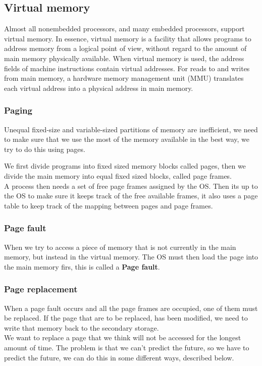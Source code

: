 \documentclass[titlepage, a4paper]{article}
\begin{document}
\subsection{Virtual memory}
Almost all nonembedded processors, and many embedded processors, support virtual memory. In essence, virtual memory is a facility that allows programs to address memory from a logical point of view, without regard to the amount of main memory physically available. When virtual memory is used, the address fields of machine instructions contain virtual addresses. For reads to and writes from main memory, a hardware memory management unit (MMU) translates each virtual address into a physical address in main memory.

\subsubsection{Paging}
Unequal fixed-size and variable-sized partitions of memory are inefficient, we need to make sure that we use the most of the memory available in the best way, we try to do this using pages.

We first divide programs into fixed sized memory blocks called pages, then we divide the main memory into equal fixed sized blocks, called page frames. \\

A process then needs a set of free page frames assigned by the OS. Then its up to the OS to make sure it keeps track of the free available frames, it also uses a page table to keep track of the mapping between pages and page frames. 

\subsubsection{Page fault}
When we try to access a piece of memory that is not currently in the main memory, but instead in the virtual memory. The OS must then load the page into the main memory firs, this is called a \textbf{Page fault}.

\subsubsection{Page replacement}
When a page fault occurs and all the page frames are occupied, one of them must be replaced. If the page that are to be replaced, has been modified, we need to write that memory back to the secondary storage. \\

We want to replace a page that we think will not be accessed for the longest amount of time. The problem is that we can't predict the future, so we have to predict the future, we can do this in some different ways, described below.
\end{document}
